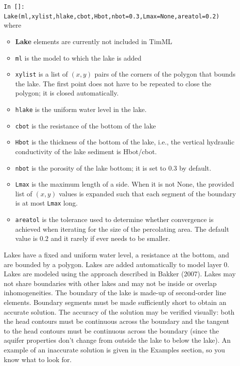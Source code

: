 \documentclass [10pt,letterpaper] {article}
\begin{document}
\begin{itemize}
\item[{\tt In []:}] {\tt Lake(ml,xylist,hlake,cbot,Hbot,nbot=0.3,Lmax=None,areatol=0.2)} where
    \begin{itemize}
     \item {\bf Lake} elements are currently not included in TimML
    \item {\tt ml} is the model to which the lake is added
    \item {\tt xylist} is a list of $(x,y)$ pairs of the corners of the polygon that bounds the lake. The first point
    does not have to be repeated to close the polygon; it is closed automatically.
    \item {\tt hlake} is the uniform water level in the lake.
    \item {\tt cbot} is the resistance of the bottom of the lake
    \item {\tt Hbot} is the thickness of the bottom of the lake, i.e., the vertical hydraulic conductivity of the lake sediment is Hbot/cbot.
    \item {\tt nbot} is the porosity of the lake bottom; it is set to 0.3 by default.
    \item {\tt Lmax} is the maximum length of a side. When it is not None, the provided list of $(x,y)$ values
    is expanded such that each segment of the boundary is at most {\tt Lmax} long.
    \item {\tt areatol} is the tolerance used to determine whether convergence is achieved when iterating for the size of the percolating area. The default value is 0.2 and it rarely if ever needs to be smaller.
    \end{itemize}
    Lakes have a fixed and uniform water level, a resistance at the bottom, and are bounded by a polygon. Lakes are added automatically to model layer 0. 
Lakes are modeled using the approach described in Bakker (2007). Lakes may not share boundaries with other lakes and may not be inside or overlap inhomogeneities. The boundary of the lake is made-up of second-order line elements. Boundary segments must be made sufficiently short to obtain an accurate solution. The accuracy of the solution may be verified visually: both the head contours must be continuous across the boundary and the tangent to the head contours must be continuous across the boundary (since the aquifer properties don't change from outside the lake to below the lake). An example of an inaccurate solution is given in the Examples section, so you know what to look for. 
\end{itemize}
\end{document}
